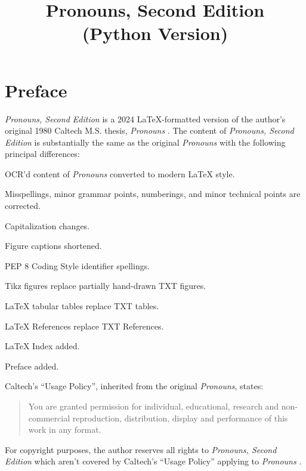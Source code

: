 \documentclass{article}
\begin{document}
%
%

\title{\textbf{Pronouns, Second Edition\\(Python Version)}}
\maketitle
\tableofcontents

%
%

\clearpage
\section*{Preface}

\textit{Pronouns, Second Edition} is a 2024 LaTeX-formatted
version of the author's original 1980 Caltech M.S. thesis,
\textit{Pronouns} \cite{Pronouns}.  The content of
\textit{Pronouns, Second Edition} is substantially the same as
the original \textit{Pronouns} with the following principal
differences:
\begin{itemize*}
\item OCR'd content of \textit{Pronouns} converted to
modern LaTeX style.
\item Misspellings, minor grammar points, numberings,
and minor technical points are corrected.
\item Capitalization changes.
\item Figure captions shortened.
\item PEP 8 Coding Style identifier spellings.
\item Tikz figures replace partially hand-drawn TXT figures.
\item LaTeX tabular tables replace TXT tables.
\item LaTeX References replace TXT References.
\item LaTeX Index added.
\item Preface added.
\end{itemize*}

Caltech's ``Usage Policy'', inherited from the original
\textit{Pronouns}, states:
\begin{quote}
You are granted permission for individual, educational, research
and non-commercial reproduction, distribution, display and performance
of this work in any format.
\end{quote}
\noindent For copyright purposes, the author reserves all rights
to \textit{Pronouns, Second Edition} which aren't
covered by Caltech's ``Usage Policy'' applying to
\textit{Pronouns} \cite{Pronouns}.
\end{document}
